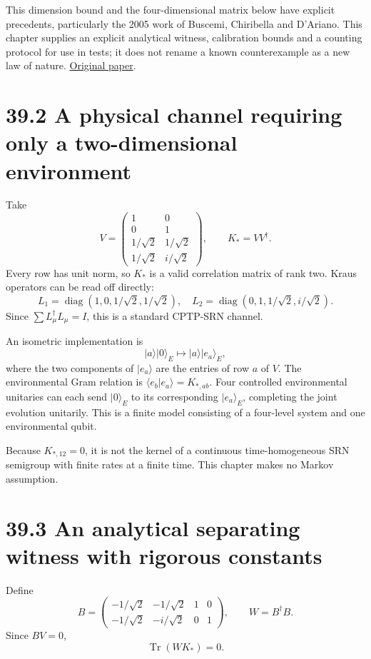 \documentclass[
  11pt,
  oneside]{book}
\begin{document}
This dimension bound and the four-dimensional matrix below have explicit
precedents, particularly the 2005 work of Buscemi, Chiribella and
D'Ariano. This chapter supplies an explicit analytical witness,
calibration bounds and a counting protocol for use in tests; it does not
rename a known counterexample as a new law of nature.
\href{https://doi.org/10.1103/PhysRevLett.95.090501}{Original paper}.

\section{39.2 A physical channel requiring only a two-dimensional
environment}

Take \[
V=\begin{pmatrix}
1&0\\0&1\\1/\sqrt2&1/\sqrt2\\1/\sqrt2&i/\sqrt2
\end{pmatrix},\qquad K_*=VV^\dagger.
\tag{39.2}
\] Every row has unit norm, so \(K_*\) is a valid correlation matrix of
rank two. Kraus operators can be read off directly: \[
L_1=\operatorname{diag}(1,0,1/\sqrt2,1/\sqrt2),\quad
L_2=\operatorname{diag}(0,1,1/\sqrt2,i/\sqrt2).
\tag{39.3}
\] Since \(\sum L_\mu^\dagger L_\mu=I\), this is a standard CPTP-SRN
channel.

An isometric implementation is \[
|a\rangle|0\rangle_E\longmapsto |a\rangle|e_a\rangle_E,
\] where the two components of \(|e_a\rangle\) are the entries of row
\(a\) of \(V\). The environmental Gram relation is
\(\langle e_b|e_a\rangle=K_{*,ab}\). Four controlled environmental
unitaries can each send \(|0\rangle_E\) to its corresponding
\(|e_a\rangle_E\), completing the joint evolution unitarily. This is a
finite model consisting of a four-level system and one environmental
qubit.

Because \(K_{*,12}=0\), it is not the kernel of a continuous
time-homogeneous SRN semigroup with finite rates at a finite time. This
chapter makes no Markov assumption.

\section{39.3 An analytical separating witness with rigorous constants}

Define \[
B=\begin{pmatrix}
-1/\sqrt2&-1/\sqrt2&1&0\\
-1/\sqrt2&-i/\sqrt2&0&1
\end{pmatrix},\qquad W=B^\dagger B.
\tag{39.4}
\] Since \(BV=0\), \[
\operatorname{Tr}(WK_*)=0.
\tag{39.5}
\]
\end{document}
